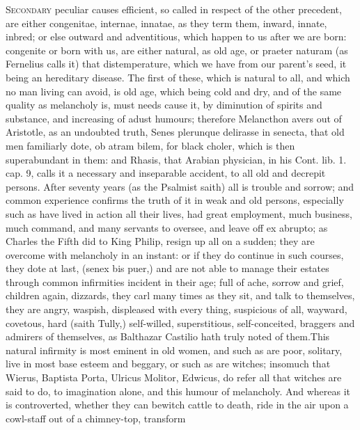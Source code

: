 {\lettrine{S}{econdary} peculiar causes efficient, so called in respect of the other
precedent, are either congenitae, internae, innatae, as they term them,
inward, innate, inbred; or else outward and adventitious, which happen
to us after we are born: congenite or born with us, are either natural,
as old age, or praeter naturam (as Fernelius calls it) that
distemperature, which we have from our parent's seed, it being an
hereditary disease. The first of these, which is natural to all, and
which no man living can avoid, is old age, which being cold and
dry, and of the same quality as melancholy is, must needs cause it, by
diminution of spirits and substance, and increasing of adust humours;
therefore  Melancthon avers out of Aristotle, as an undoubted
truth, Senes plerunque delirasse in senecta, that old men familiarly
dote, ob atram bilem, for black choler, which is then superabundant in
them: and Rhasis, that Arabian physician, in his Cont. lib. 1. cap. 9,
calls it a necessary and inseparable accident, to all old and
decrepit persons. After seventy years (as the Psalmist saith) all
is trouble and sorrow; and common experience confirms the truth of it
in weak and old persons, especially such as have lived in action all
their lives, had great employment, much business, much command, and
many servants to oversee, and leave off ex abrupto; as Charles
the Fifth did to King Philip, resign up all on a sudden; they are
overcome with melancholy in an instant: or if they do continue in such
courses, they dote at last, (senex bis puer,) and are not able to
manage their estates through common infirmities incident in their age;
full of ache, sorrow and grief, children again, dizzards, they carl
many times as they sit, and talk to themselves, they are angry,
waspish, displeased with every thing, suspicious of all, wayward,
covetous, hard (saith Tully,) self-willed, superstitious,
self-conceited, braggers and admirers of themselves, as Balthazar
Castilio hath truly noted of them.This natural infirmity is most
eminent in old women, and such as are poor, solitary, live in most base
esteem and beggary, or such as are witches; insomuch that Wierus,
Baptista Porta, Ulricus Molitor, Edwicus, do refer all that witches are
said to do, to imagination alone, and this humour of melancholy. And
whereas it is controverted, whether they can bewitch cattle to death,
ride in the air upon a cowl-staff out of a chimney-top, transform
}
